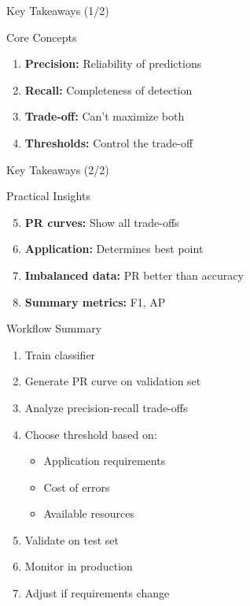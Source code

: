 \documentclass{beamer}
\begin{document}
\begin{frame}{Key Takeaways (1/2)}
\begin{keypointsbox}{Core Concepts}
\small
\begin{enumerate}
    \item \textbf{Precision:} Reliability of predictions
    \item \textbf{Recall:} Completeness of detection
    \item \textbf{Trade-off:} Can't maximize both
    \item \textbf{Thresholds:} Control the trade-off
\end{enumerate}
\end{keypointsbox}
\end{frame}

\begin{frame}{Key Takeaways (2/2)}
\begin{keypointsbox}{Practical Insights}
\small
\begin{enumerate}
    \setcounter{enumi}{4}
    \item \textbf{PR curves:} Show all trade-offs
    \item \textbf{Application:} Determines best point
    \item \textbf{Imbalanced data:} PR better than accuracy
    \item \textbf{Summary metrics:} F1, AP
\end{enumerate}
\end{keypointsbox}
\end{frame}

\begin{frame}{Workflow Summary}
\begin{enumerate}
    \item Train classifier
    \item Generate PR curve on validation set
    \item Analyze precision-recall trade-offs
    \item Choose threshold based on:
    \begin{itemize}
        \item Application requirements
        \item Cost of errors
        \item Available resources
    \end{itemize}
    \item Validate on test set
    \item Monitor in production
    \item Adjust if requirements change
\end{enumerate}
\end{frame}
\end{document}
